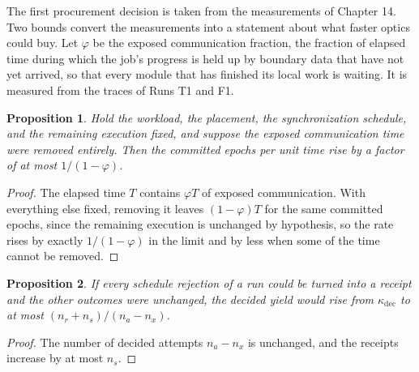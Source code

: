 \documentclass[11pt,openany]{book}
\newtheorem{proposition}{Proposition}[chapter]
\theoremstyle{remark}
\begin{document}
The first procurement decision is taken from the measurements of Chapter 14. Two bounds convert the measurements into a statement about what faster optics could buy. Let $\varphi$ be the exposed communication fraction, the fraction of elapsed time during which the job's progress is held up by boundary data that have not yet arrived, so that every module that has finished its local work is waiting. It is measured from the traces of Runs T1 and F1.

\begin{proposition}\label{prop:amdahl}
Hold the workload, the placement, the synchronization schedule, and the remaining execution fixed, and suppose the exposed communication time were removed entirely. Then the committed epochs per unit time rise by a factor of at most $1/(1-\varphi)$.
\end{proposition}
\begin{proof}
The elapsed time $T$ contains $\varphi T$ of exposed communication. With everything else fixed, removing it leaves $(1-\varphi)T$ for the same committed epochs, since the remaining execution is unchanged by hypothesis, so the rate rises by exactly $1/(1-\varphi)$ in the limit and by less when some of the time cannot be removed.
\end{proof}

\begin{proposition}\label{prop:yieldbound}
If every schedule rejection of a run could be turned into a receipt and the other outcomes were unchanged, the decided yield would rise from $\kappa_{\mathrm{dec}}$ to at most $(n_r+n_s)/(n_a-n_x)$.
\end{proposition}
\begin{proof}
The number of decided attempts $n_a-n_x$ is unchanged, and the receipts increase by at most $n_s$.
\end{proof}
\end{document}
